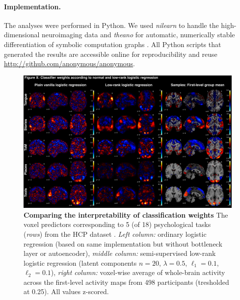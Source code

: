 \documentclass{article} %
\begin{document}
\paragraph{Implementation.}
The analyses were performed in Python.
We used \textit{nilearn} to handle
the high-dimensional neuroimaging data 
\cite{abrah14}
and
\textit{theano} for automatic, numerically stable
differentiation of symbolic computation graphs
\cite{bastien2012theano, bergstra2010theano}.
All Python scripts that generated the results are
accessible online for reproducibility and reuse
\url{http://github.com/anonymous/anonymous}.

\bigskip

\begin{figure}
\begin{centering}
\includegraphics[width=1.00\textwidth]{figures/figure_weights.jpg}
\end{centering}
\caption{\textbf{Comparing the interpretability of classification weights}
The voxel predictors corresponding to 5 (of 18) psychological tasks (\textit{rows})
from the HCP dataset \cite{barch2013}.
\textit{Left column:} ordinary logistic regression (based on same
implementation but without bottleneck layer or autoencoder),
\textit{middle column:} semi-supervised low-rank logistic regression
(latent components $n=20$, $\lambda=0.5$, $\ell_1=0.1$, $\ell_2=0.1$),
\textit{right column:} voxel-wise average of whole-brain activity
across the first-level activity maps from 498 participants
(tresholded at 0.25).
All values z-scored.
}
\end{figure}
\end{document}
